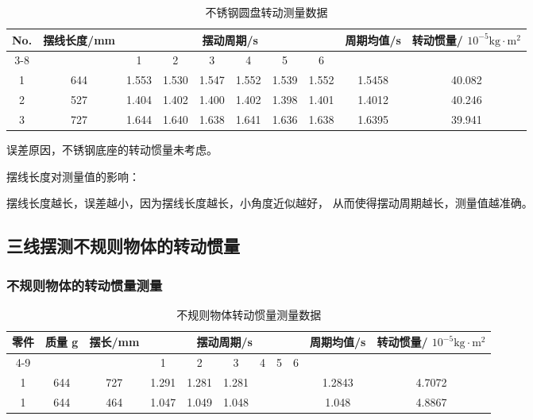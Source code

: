 \begin{table}[h!]
\centering
\renewcommand{\arraystretch}{1.5}
\setlength{\tabcolsep}{8pt}
\begin{tabular}{|c|c|c|c|c|c|c|c|c|c|}
\hline
\multirow{3}{*}{\textbf{No.}} & \multirow{3}{*}{\textbf{摆线长度/mm}} & \multicolumn{6}{c|}{\textbf{摆动周期/s}} & \multirow{3}{*}{\textbf{周期均值/s}} & \multirow{3}{*}{\textbf{转动惯量/ $ \mathrm{10^{-5}kg \cdot m^2} $}}  \\ \cline{3-8}
& & 1 & 2 & 3 & 4 & 5 & 6 & & \\ \hline
1 & 644 & 1.553 & 1.530 & 1.547 & 1.552 & 1.539 & 1.552 & 1.5458 & 40.082 \\ \hline
2 & 527 & 1.404 & 1.402 & 1.400 & 1.402 & 1.398 & 1.401 & 1.4012 & 40.246 \\ \hline
3 & 727 & 1.644 & 1.640 & 1.638 & 1.641 & 1.636 & 1.638 & 1.6395 & 39.941 \\ \hline
\end{tabular}
\caption{不锈钢圆盘转动测量数据}
\label{tab:raw_data}
\end{table}

误差原因，不锈钢底座的转动惯量未考虑。

摆线长度对测量值的影响：

摆线长度越长，误差越小，因为摆线长度越长，小角度近似越好，
从而使得摆动周期越长，测量值越准确。
\subsection{三线摆测不规则物体的转动惯量}
\subsubsection{不规则物体的转动惯量测量}

\begin{table}[h!]
    \centering
    \renewcommand{\arraystretch}{1.5}
    \setlength{\tabcolsep}{8pt}
    \begin{tabular}{|c|c|c|c|c|c|c|c|c|c|c|}
    \hline
    \multirow{3}{*}{\textbf{零件}} & \multirow{3}{*}{\textbf{质量 g}} & \multirow{3}{*}{\textbf{摆长/mm}} & \multicolumn{6}{c|}{\textbf{摆动周期/s}} & \multirow{3}{*}{\textbf{周期均值/s}} & \multirow{3}{*}{\textbf{转动惯量/ $ \mathrm{10^{-5}kg \cdot m^2} $}}  \\ \cline{4-9}
    & & & 1 & 2 & 3 & 4 & 5 & 6 & & \\ \hline
    1 & 644 & 727 & 1.291 & 1.281 & 1.281 &  &  &  & 1.2843 & 4.7072 \\ \hline
    1 & 644 & 464 & 1.047 & 1.049 & 1.048 &  &  &  & 1.048 & 4.8867 \\ \hline
    \end{tabular}
    \caption{不规则物体转动惯量测量数据}
    \label{tab:irregular_data}
\end{table}

